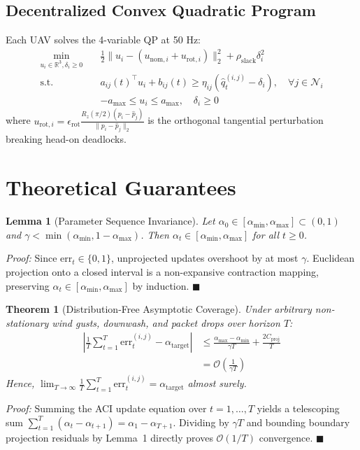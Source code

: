 \documentclass[lettersize,journal]{IEEEtran}
\newtheorem{theorem}{Theorem}
\newtheorem{lemma}{Lemma}
\newenvironment{proof}{\textit{Proof:}}{\hfill$\blacksquare$\medskip}
\begin{document}
\subsection{Decentralized Convex Quadratic Program}
Each UAV solves the 4-variable QP at 50 Hz:
\begin{align}
\min_{u_i \in \mathbb{R}^3, \delta_i \ge 0} \quad & \frac{1}{2} \|u_i - (u_{\mathrm{nom},i} + u_{\mathrm{rot},i})\|_2^2 + \rho_{\mathrm{slack}} \delta_i^2 \nonumber \\
\text{s.t.} \quad & a_{ij}(t)^\top u_i + b_{ij}(t) \ge \eta_{ij} (\hat{q}_t^{(i,j)} - \delta_i), \quad \forall j \in \mathcal{N}_i \nonumber \\
& -a_{\max} \le u_i \le a_{\max}, \quad \delta_i \ge 0
\end{align}
where $u_{\mathrm{rot},i} = \epsilon_{\mathrm{rot}} \frac{R_z(\pi/2)(p_i - \hat{p}_j)}{\|p_i - \hat{p}_j\|_2}$ is the orthogonal tangential perturbation breaking head-on deadlocks.

\section{Theoretical Guarantees}
\begin{lemma}[Parameter Sequence Invariance]
Let $\alpha_0 \in [\alpha_{\min}, \alpha_{\max}] \subset (0, 1)$ and $\gamma < \min(\alpha_{\min}, 1 - \alpha_{\max})$. Then $\alpha_t \in [\alpha_{\min}, \alpha_{\max}]$ for all $t \ge 0$.
\end{lemma}
\begin{proof}
Since $\mathrm{err}_t \in \{0, 1\}$, unprojected updates overshoot by at most $\gamma$. Euclidean projection onto a closed interval is a non-expansive contraction mapping, preserving $\alpha_t \in [\alpha_{\min}, \alpha_{\max}]$ by induction.
\end{proof}

\begin{theorem}[Distribution-Free Asymptotic Coverage]
Under arbitrary non-stationary wind gusts, downwash, and packet drops over horizon $T$:
\begin{align}
\left| \frac{1}{T} \sum_{t=1}^T \mathrm{err}_t^{(i,j)} - \alpha_{\mathrm{target}} \right| &\le \frac{\alpha_{\max} - \alpha_{\min}}{\gamma T} + \frac{2 C_{\mathrm{proj}}}{T} \nonumber \\
&= \mathcal{O}\left( \frac{1}{\gamma T} \right)
\end{align}
Hence, $\lim_{T \to \infty} \frac{1}{T} \sum_{t=1}^T \mathrm{err}_t^{(i,j)} = \alpha_{\mathrm{target}}$ almost surely.
\end{theorem}
\begin{proof}
Summing the ACI update equation over $t=1, \dots, T$ yields a telescoping sum $\sum_{t=1}^T (\alpha_t - \alpha_{t+1}) = \alpha_1 - \alpha_{T+1}$. Dividing by $\gamma T$ and bounding boundary projection residuals by Lemma~1 directly proves $\mathcal{O}(1/T)$ convergence.
\end{proof}
\end{document}
